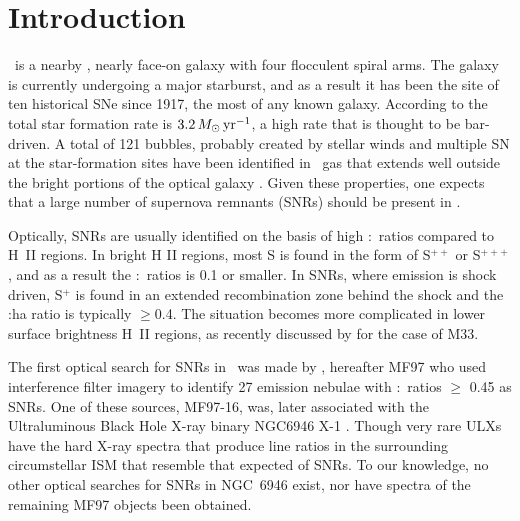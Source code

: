
\section{Introduction} \label{sec:intro}

\gal\ is a nearby \cite[6.72$\pm$ 0.15 Mpc,][]{tikhonov14}, nearly face-on \cite[32.6$\degr$,][]{deblok08} galaxy with four flocculent spiral arms.  The galaxy is currently undergoing a major starburst, and as a result it has been the site of ten historical SNe since 1917, the most of any known galaxy. According to \citet{jarrett13} the total star formation rate is $3.2\, M_\odot\,{\rm yr}^{-1}$, a high rate that is thought to be bar-driven.  A total of 121 bubbles, probably created by stellar winds and multiple SN at the star-formation sites have been identified in \hi\ gas that extends well outside the bright portions of the optical galaxy \citep{boomsma08}.  %
Given these properties, one expects that a large number of supernova remnants (SNRs) should be present in \gal.   

Optically, SNRs are usually identified on the basis of high \sii:\ha\ ratios compared to H~II regions.  In bright H II regions, most S is found in the form of S$^{++}$ or S$^{+++}$, and as a result the \sii:\ha\ ratios is 0.1 or smaller.  In SNRs, where emission is shock driven, S$^+$ is found in an extended recombination zone behind the shock and the \sii:ha ratio is typically $\geq$0.4.  The situation becomes more complicated in lower surface brightness H~II regions, as recently discussed by \cite{long18} for the case of M33.

The first optical search for SNRs in \gal\ was made by \cite{matonick97}, hereafter MF97 who used interference filter imagery to identify 27 emission nebulae with \sii:\ha\ ratios $\geq$ 0.45 as SNRs.  One of these sources, MF97-16, was, later associated with the Ultraluminous Black Hole X-ray binary NGC6946 X-1 \cite{roberts03}. Though very rare ULXs have  the hard X-ray spectra that produce line ratios in the surrounding circumstellar ISM that resemble that expected of SNRs. To our knowledge, no other optical searches for SNRs in NGC~6946 exist, nor have spectra of the remaining MF97 objects been obtained.  

